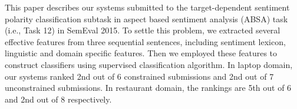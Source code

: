 This paper describes our systems submitted to the target-dependent sentiment polarity classification subtask in aspect based sentiment analysis (ABSA) task (i.e., Task 12) in SemEval 2015. To settle this problem, we extracted several effective features from three sequential sentences, including sentiment lexicon, linguistic and domain specific features. Then we employed these features to construct classifiers using supervised classification algorithm. In laptop domain, our systems ranked 2nd out of 6 constrained submissions and 2nd out of 7 unconstrained submissions. In restaurant domain, the rankings are 5th out of 6 and 2nd out of 8 respectively.
